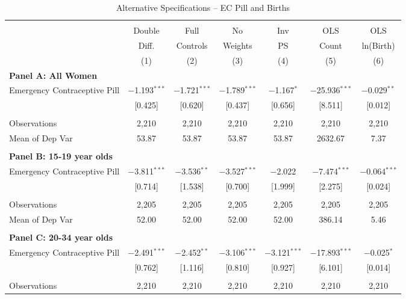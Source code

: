 \begin{landscape}
\begin{table}[!htbp] \centering
\caption{Alternative Specifications -- EC Pill and Births}
\label{TEENtab:BirthRobust}
\begin{tabular}{@{\extracolsep{5pt}}lcccccc}
\\[-1.8ex]\hline \hline \\[-1.8ex] 
&Double&Full    & No     &Inv & OLS   & OLS        \\
&Diff. &Controls& Weights&PS  & Count & ln(Birth)  \\ 
&(1)&(2)&(3)&(4)&(5)&(6) \\ \midrule
\multicolumn{7}{l}{\textbf{
\noindent Panel A: All Women}} \\
Emergency Contraceptive Pill & $-$1.193$^{***}$ & $-$1.721$^{***}$ & $-$1.789$^{***}$ & $-$1.167$^{*}$ & $-$25.936$^{***}$ & $-$0.029$^{**}$ \\
& [0.425] & [0.620] & [0.437] & [0.656] & [8.511] & [0.012] \\
 & & & & & & \\
Observations& 2,210 & 2,210 & 2,210 & 2,210 & 2,210 & 2,210 \\
Mean of Dep Var& 53.87 & 53.87 & 53.87 & 53.87 & 2632.67 & 7.37 \\
 & & & & & & \\ \multicolumn{7}{l}{\textbf{
\noindent Panel B: 15-19 year olds}} \\
Emergency Contraceptive Pill & $-$3.811$^{***}$ & $-$3.536$^{**}$ & $-$3.527$^{***}$ & $-$2.022 & $-$7.474$^{***}$ & $-$0.064$^{***}$ \\
& [0.714] & [1.538] & [0.700] & [1.999] & [2.275] & [0.024] \\
 & & & & & & \\
Observations& 2,205 & 2,205 & 2,205 & 2,205 & 2,205 & 2,205 \\
Mean of Dep Var& 52.00 & 52.00 & 52.00 & 52.00 & 386.14 & 5.46 \\
 & & & & & & \\ \multicolumn{7}{l}{\textbf{
\noindent Panel C: 20-34 year olds}} \\
Emergency Contraceptive Pill & $-$2.491$^{***}$ & $-$2.452$^{**}$ & $-$3.106$^{***}$ & $-$3.121$^{***}$ & $-$17.893$^{***}$ & $-$0.025$^{*}$ \\
& [0.762] & [1.116] & [0.810] & [0.927] & [6.101] & [0.014] \\
 & & & & & & \\
Observations& 2,210 & 2,210 & 2,210 & 2,210 & 2,210 & 2,210 \\

\end{tabular}
\end{table}
\end{landscape}
